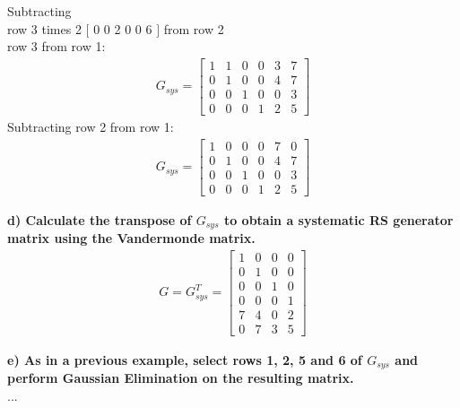 Subtracting \\row 3 times 2 $[$ 0 0 2 0 0 6 $]$ from row 2 \\ row 3 from row 1:\\
\begin{align}
    G_{sys} = 
    \begin{bmatrix}
        1 & 1 & 0 & 0 & 3 & 7 \\
        0 & 1 & 0 & 0 & 4 & 7 \\
        0 & 0 & 1 & 0 & 0 & 3 \\
        0 & 0 & 0 & 1 & 2 & 5 
    \end{bmatrix}
\end{align} 
Subtracting row 2 from row 1:\\
\begin{align}
    G_{sys} = 
    \begin{bmatrix}
        1 & 0 & 0 & 0 & 7 & 0 \\
        0 & 1 & 0 & 0 & 4 & 7 \\
        0 & 0 & 1 & 0 & 0 & 3 \\
        0 & 0 & 0 & 1 & 2 & 5 
    \end{bmatrix}
\end{align} 

\noindent\textbf{d) Calculate the transpose of $G_{sys}$ to obtain a systematic RS generator matrix using the Vandermonde matrix.}\\
\begin{align}
    G = G_{sys}^T = 
    \begin{bmatrix}
        1 & 0 & 0 & 0 \\
        0 & 1 & 0 & 0 \\
        0 & 0 & 1 & 0 \\
        0 & 0 & 0 & 1 \\
        7 & 4 & 0 & 2 \\
        0 & 7 & 3 & 5
    \end{bmatrix}
\end{align}

\noindent\textbf{e) As in a previous example, select rows 1, 2, 5 and 6 of $G_{sys}$ and perform Gaussian Elimination on the resulting matrix.}\\
...

\pagebreak